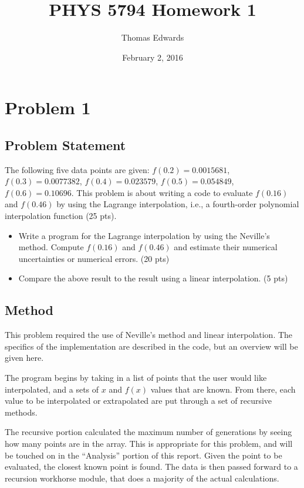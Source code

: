 \documentclass[10pt,letter]{article}
\begin{document}
\begin{titlepage}
\title{PHYS 5794 Homework 1}
\date{February 2, 2016}
\author{Thomas Edwards}
\maketitle
\end{titlepage}

\section{Problem 1}


\subsection{Problem Statement}
The following five data points are given: $f(0.2) = 0.0015681$, $f(0.3) = 0.0077382$, $f(0.4) = 0.023579$,
$f(0.5) = 0.054849$, $f(0.6) = 0.10696$. This problem is about writing a code to evaluate $f(0.16)$ and
$f(0.46)$ by using the Lagrange interpolation, i.e., a fourth-order polynomial interpolation function
(25 pts).
\begin{itemize}
\item Write a program for the Lagrange interpolation by using the Neville's method. Compute $f(0.16)$
and $f(0.46)$ and estimate their numerical uncertainties or numerical errors. (20 pts)
\item Compare the above result to the result using a linear interpolation. (5 pts)
\end{itemize}

\subsection{Method}

This problem required the use of Neville's method and linear interpolation. The specifics of the implementation are described in the code, but an overview will be given here.

The program begins by taking in a list of points that the user would like interpolated, and a sets of $x$ and $f(x)$ values that are known. From there, each value to be interpolated or extrapolated are put through a set of recursive methods.

The recursive portion calculated the maximum number of generations by seeing how many points are in the array. This is appropriate for this problem, and will be touched on in the ``Analysis'' portion of this report. Given the point to be evaluated, the closest known point is found. The data is then passed forward to a recursion workhorse module, that does a majority of the actual calculations.
\end{document}
